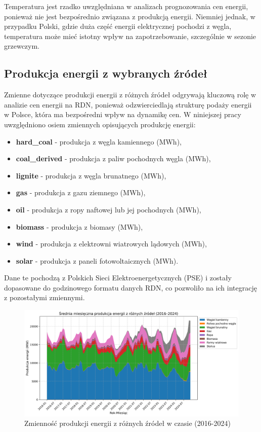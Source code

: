 Temperatura jest rzadko uwzględniana w analizach prognozowania cen energii, ponieważ nie jest bezpośrednio związana z produkcją energii. Niemniej jednak, w przypadku Polski, gdzie duża część energii elektrycznej pochodzi z węgla, temperatura może mieć istotny wpływ na zapotrzebowanie, szczególnie w sezonie grzewczym.

\subsection{Produkcja energii z wybranych źródeł}
Zmienne dotyczące produkcji energii z różnych źródeł odgrywają kluczową rolę w analizie cen energii na RDN, ponieważ odzwierciedlają strukturę podaży energii w Polsce, która ma bezpośredni wpływ na dynamikę cen. W niniejszej pracy uwzględniono osiem zmiennych opisujących produkcję energii: 
\begin{itemize}
    \item \textbf{hard\_coal} - produkcja z węgla kamiennego (MWh),
    \item \textbf{coal\_derived} - produkcja z paliw pochodnych węgla (MWh),
    \item \textbf{lignite} - produkcja z węgla brunatnego (MWh),
    \item \textbf{gas} - produkcja z gazu ziemnego (MWh),
    \item \textbf{oil} - produkcja z ropy naftowej lub jej pochodnych (MWh),
    \item \textbf{biomass} - produkcja z biomasy (MWh),
    \item \textbf{wind} - produkcja z elektrowni wiatrowych lądowych (MWh),
    \item \textbf{solar} - produkcja z paneli fotowoltaicznych (MWh).
\end{itemize}

Dane te pochodzą z Polskich Sieci Elektroenergetycznych (PSE) i zostały dopasowane do godzinowego formatu danych RDN, co pozwoliło na ich integrację z pozostałymi zmiennymi. 
\begin{figure}[H]
    \centering
    \includegraphics[width=1.0\textwidth]{../plots/energy/energy_production_time_series_full.png}
    \caption{Zmienność produkcji energii z różnych źródeł w czasie (2016-2024)}
    \label{fig:energy-production-time-series-full}
\end{figure}

